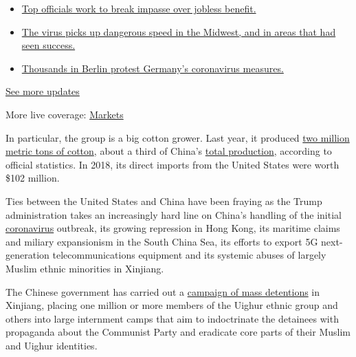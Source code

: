 \begin{itemize}
\tightlist
\item
  \href{https://www.nytimes.com/2020/08/01/world/coronavirus-covid-19.html?action=click\&pgtype=Article\&state=default\&region=MAIN_CONTENT_1\&context=storylines_live_updates\#link-3ac56579}{Top
  officials work to break impasse over jobless benefit.}
\item
  \href{https://www.nytimes.com/2020/08/01/world/coronavirus-covid-19.html?action=click\&pgtype=Article\&state=default\&region=MAIN_CONTENT_1\&context=storylines_live_updates\#link-8796723}{The
  virus picks up dangerous speed in the Midwest, and in areas that had
  seen success.}
\item
  \href{https://www.nytimes.com/2020/08/01/world/coronavirus-covid-19.html?action=click\&pgtype=Article\&state=default\&region=MAIN_CONTENT_1\&context=storylines_live_updates\#link-25930521}{Thousands
  in Berlin protest Germany's coronavirus measures.}
\end{itemize}

\href{https://www.nytimes.com/2020/08/01/world/coronavirus-covid-19.html?action=click\&pgtype=Article\&state=default\&region=MAIN_CONTENT_1\&context=storylines_live_updates}{See
more updates}

More live coverage:
\href{https://www.nytimes.com/live/2020/07/31/business/stock-market-today-coronavirus?action=click\&pgtype=Article\&state=default\&region=MAIN_CONTENT_1\&context=storylines_live_updates}{Markets}

In particular, the group is a big cotton grower. Last year, it produced
\href{http://www.xjbt.gov.cn/c/2020-04-26/7346731.shtml?ad_check=1}{two
million metric tons of cotton}, about a third of China's
\href{http://www.stats.gov.cn/tjsj/zxfb/201912/t20191217_1718007.html}{total
production}, according to official statistics. In 2018, its direct
imports from the United States were worth \$102 million.

Ties between the United States and China have been fraying as the Trump
administration takes an increasingly hard line on China's handling of
the initial
\href{https://www.nytimes.com/news-event/coronavirus}{coronavirus}
outbreak, its growing repression in Hong Kong, its maritime claims and
miliary expansionism in the South China Sea, its efforts to export 5G
next-generation telecommunications equipment and its systemic abuses of
largely Muslim ethnic minorities in Xinjiang.

The Chinese government has carried out a
\href{https://www.nytimes.com/interactive/2019/11/16/world/asia/china-xinjiang-documents.html}{campaign
of mass detentions} in Xinjiang, placing one million or more members of
the Uighur ethnic group and others into large internment camps that aim
to indoctrinate the detainees with propaganda about the Communist Party
and eradicate core parts of their Muslim and Uighur identities.

